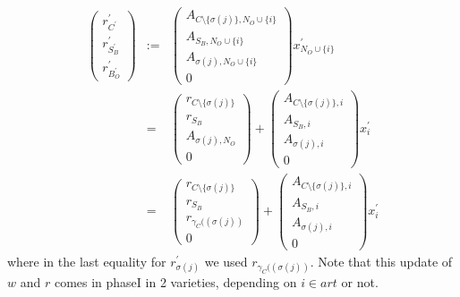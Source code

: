 \documentclass[a4paper]{article}
\begin{document}
\begin{eqnarray}
\left(
\begin{array}{c}
r_{C^{\prime}}^{\prime} \\
\hline
r_{S_{B}^{\prime}}^{\prime} \\
\hline
r_{B_{O}^{\prime}}^{\prime}
\end{array}
\right)
&:=&
\left(
\begin{array}{c}
A_{C \setminus \{\sigma(j)\}, N_{O} \cup \{i\}} \\
\hline
A_{S_{B}, N_{O} \cup \{i\}} \\
\hline
A_{\sigma(j), N_{O} \cup \{i\}} \\
\hline
0
\end{array}
\right)
x_{N_{O} \cup \{i\}}^{\prime}
\nonumber \\
&=&
\left(
\begin{array}{c}
r_{C \setminus \{\sigma(j)\}} \\
\hline
r_{S_{B}} \\
\hline
A_{\sigma(j), N_{O}} \\
\hline
0
\end{array}
\right)
+
\left(
\begin{array}{c}
A_{C \setminus \{\sigma(j)\}, i} \\
\hline
A_{S_{B}, i} \\
\hline
A_{\sigma(j), i} \\
\hline
0
\end{array}
\right)
x_{i}^{\prime}
\nonumber \\
&=&
\left(
\begin{array}{c}
r_{C \setminus \{\sigma(j)\}} \\
\hline
r_{S_{B}} \\
\hline
r_{\gamma_{C}((\sigma(j))} \\
\hline
0
\end{array}
\right)
+
\left(
\begin{array}{c}
A_{C \setminus \{\sigma(j)\}, i} \\
\hline
A_{S_{B}, i} \\
\hline
A_{\sigma(j), i} \\
\hline
0
\end{array}
\right)
x_{i}^{\prime}
\end{eqnarray}
where in the last equality for $r_{\sigma(j)}^{\prime}$ we used
$r_{\gamma_{C}((\sigma(j))}$. Note that this update of $w$ and $r$ comes in
phaseI in 2 varieties, depending on $i \in art$ or not.
\end{document}
